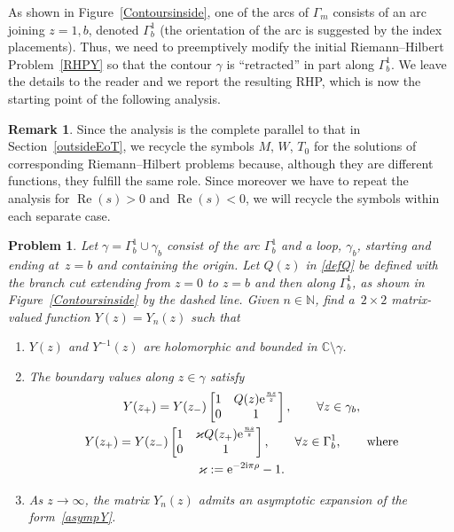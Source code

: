 \documentclass[10pt,a4paper]{amsart}
\numberwithin{equation}{section}
\newtheorem{problem}[Theorem]{Problem}
\theoremstyle{definition}
\newtheorem{Remark}[Theorem]{Remark}
\def\C{{\mathbb C}}
\def \Re{\operatorname{Re} }
\begin{document}
As shown in Figure~\ref{Contoursinside}, one of the arcs of $\Gamma_m$ consists of an arc joining $z=1,b$, denoted $\Gamma_b^1$ (the orientation of the arc is suggested by the index placements). Thus, we need to preemptively modify the initial Riemann--Hilbert Problem~\ref{RHPY} so that the contour $\gamma$ is ``retracted'' in part along $\Gamma_b^1$. We leave the details to the reader and we report the resulting RHP, which is now the starting point of the following analysis.

\begin{Remark}\label{MRN}
Since the analysis is the complete parallel to that in Section~\ref{outsideEoT}, we recycle the symbols $M$, $W$, $T_0$ for the solutions of corresponding Riemann--Hilbert problems because, although they are different functions, they fulfill the same role. Since moreover we have to repeat the analysis for $\Re(s)>0$ and $\Re(s)<0$, we will recycle the symbols within each separate case.
\end{Remark}
\begin{problem}\label{RHPYg1}
Let $\gamma = \Gamma_b^1 \cup \gamma_b$ consist of the arc $\Gamma_b^1$ and a loop, $\gamma_b$, starting and ending at~${z=b}$ and containing the origin. Let $Q(z)$ in \eqref{defQ} be defined with the branch cut extending from $z=0$ to $z=b$ and then along $\Gamma_b^1$, as shown in Figure~{\rm\ref {Contoursinside}} by the dashed line.
Given $n\in \mathbb N$,
find a~${2\times 2}$ matrix-valued function $Y(z)= Y_n(z)$ such that
\begin{enumerate}\itemsep=0pt
\item[$(1)$] $Y(z)$ and $Y^{-1}(z)$ are holomorphic and bounded in $\C\setminus \gamma$.
\item[$(2)$] The boundary values along $z\in \gamma$ satisfy
\begin{gather}
Y(z_+) = Y(z_-) \begin{bmatrix}
1&Q(z){\rm e}^{\frac {ns}z}\\
0 & 1
\end{bmatrix},\qquad \forall z\in \gamma_b,
\nonumber\\
Y(z_+) = Y(z_-) \begin{bmatrix}
1&\varkappa Q(z_+) {\rm e}^{\frac {ns}z}\\
0 & 1
\end{bmatrix}, \qquad \forall z\in \Gamma_b^1,\qquad
\text{where}\nonumber\\
\label{defkappa}
\varkappa:=
 {\rm e}^{-2{\rm i}\pi { {\rho}}}-1.
\end{gather}
\item[$(3)$] As $z\to \infty$, the matrix $Y_n(z)$ admits an asymptotic expansion of the form~\eqref{asympY}.
\end{enumerate}
\end{problem}
\end{document}
